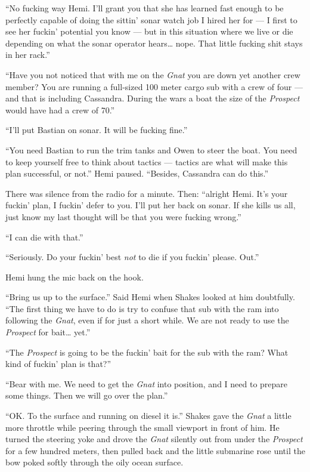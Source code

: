 \documentclass[]{scrbook}
\begin{document}
``No fucking way Hemi. I'll grant you that she has learned fast enough
to be perfectly capable of doing the sittin' sonar watch job I hired her
for --- I first to see her fuckin' potential you know --- but in this
situation where we live or die depending on what the sonar operator
hears\ldots{} nope. That little fucking shit stays in her rack.''

``Have you not noticed that with me on the \emph{Gnat} you are down yet
another crew member? You are running a full-sized 100 meter cargo sub
with a crew of four --- and that is including Cassandra. During the wars
a boat the size of the \emph{Prospect} would have had a crew of 70.''

``I'll put Bastian on sonar. It will be fucking fine.''

``You need Bastian to run the trim tanks and Owen to steer the boat. You
need to keep yourself free to think about tactics --- tactics are what
will make this plan successful, or not.'' Hemi paused. ``Besides,
Cassandra can do this.''

There was silence from the radio for a minute. Then: ``alright Hemi.
It's your fuckin' plan, I fuckin' defer to you. I'll put her back on
sonar. If she kills us all, just know my last thought will be that you
were fucking wrong.''

``I can die with that.''

``Seriously. Do your fuckin' best \emph{not} to die if you fuckin'
please. Out.''

Hemi hung the mic back on the hook.

``Bring us up to the surface.'' Said Hemi when Shakes looked at him
doubtfully. ``The first thing we have to do is try to confuse that sub
with the ram into following the \emph{Gnat}, even if for just a short
while. We are not ready to use the \emph{Prospect} for bait\ldots{}
yet.''

``The \emph{Prospect} is going to be the fuckin' bait for the sub with
the ram? What kind of fuckin' plan is that?''

``Bear with me. We need to get the \emph{Gnat} into position, and I need
to prepare some things. Then we will go over the plan.''

``OK. To the surface and running on diesel it is.'' Shakes gave the
\emph{Gnat} a little more throttle while peering through the small
viewport in front of him. He turned the steering yoke and drove the
\emph{Gnat} silently out from under the \emph{Prospect} for a few
hundred meters, then pulled back and the little submarine rose until the
bow poked softly through the oily ocean surface.
\end{document}
